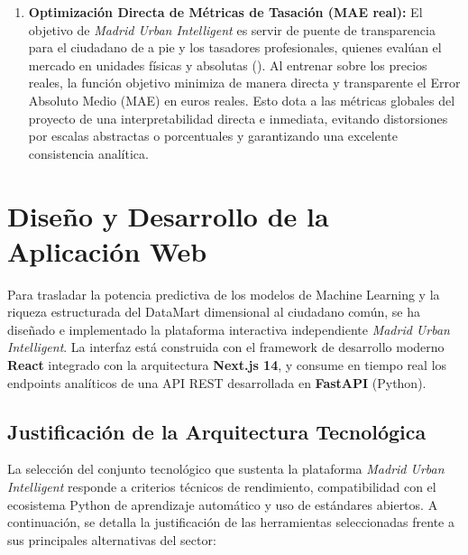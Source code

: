 \documentclass[a4paper,11pt,openany]{book}
\begin{document}
\begin{enumerate}
    \item \textbf{Optimización Directa de Métricas de Tasación (MAE real):} El objetivo de \textit{Madrid Urban Intelligent} es servir de puente de transparencia para el ciudadano de a pie y los tasadores profesionales, quienes evalúan el mercado en unidades físicas y absolutas (). Al entrenar sobre los precios reales, la función objetivo minimiza de manera directa y transparente el Error Absoluto Medio (MAE) en euros reales. Esto dota a las métricas globales del proyecto de una interpretabilidad directa e inmediata, evitando distorsiones por escalas abstractas o porcentuales y garantizando una excelente consistencia analítica.
\end{enumerate}

\chapter{Diseño y Desarrollo de la Aplicación Web}
\label{chap:web_frontend}
Para trasladar la potencia predictiva de los modelos de Machine Learning y la riqueza estructurada del DataMart dimensional al ciudadano común, se ha diseñado e implementado la plataforma interactiva independiente \textit{Madrid Urban Intelligent}. La interfaz está construida con el framework de desarrollo moderno \textbf{React} integrado con la arquitectura \textbf{Next.js 14}, y consume en tiempo real los endpoints analíticos de una API REST desarrollada en \textbf{FastAPI} (Python).

\section{Justificación de la Arquitectura Tecnológica}
La selección del conjunto tecnológico que sustenta la plataforma \textit{Madrid Urban Intelligent} responde a criterios técnicos de rendimiento, compatibilidad con el ecosistema Python de aprendizaje automático y uso de estándares abiertos. A continuación, se detalla la justificación de las herramientas seleccionadas frente a sus principales alternativas del sector:
\end{document}
